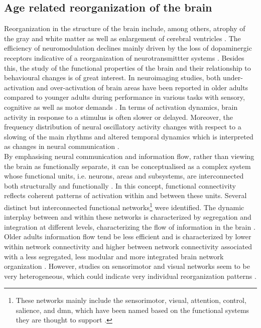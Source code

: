 \subsection{Age related reorganization of the brain}
\label{theory:aging:brain}
Reorganization in the structure of the brain include, among others, atrophy of the gray and white matter as well as enlargement of cerebral ventricles \cite{Fjell2010}. The efficiency of neuromodulation declines mainly driven by the loss of dopaminergic receptors indicative of a reorganization of neurotransmittter systems \cite{Li2001}. Besides this, the study of the functional properties of the brain and their relationship to behavioural changes is of great interest. In neuroimaging studies, both under-activation and over-activation of brain areas have been reported in older adults compared to younger adults during performance in various tasks with sensory, cognitive as well as motor demands \cite{Reuter-Lorenz2010, Sala-Llonch2015}. In terms of activation dynamics, brain activity in response to a stimulus is often slower or delayed. Moreover, the frequency distribution of neural oscillatory activity changes with respect to a slowing of the main rhythms and altered temporal dynamics which is interpreted as changes in neural communication \cite{Courtney2021}.\\ 
By emphasising neural communication and information flow, rather than viewing the brain as functionally separate, it can be conceptualised as a complex system whose functional units, i.e. neurons, areas and subsystems, are interconnected both structurally and functionally \cite{Friston2011,Deery2023}. In this concept, functional connectivity reflects coherent patterns of activation within and between these units. Several distinct but interconnected functional networks\footnote{These networks mainly include the sensorimotor, visual, attention, control, salience, and \gls{dmn}, which have been named based on the functional systems they are thought to support \cite{Uddin2019}.} were identified. The dynamic interplay between and within these networks is characterized by segregation and integration at different levels, characterizing the flow of information in the brain \cite{Sporns2013}. Older adults information flow tend be less efficient and is characterized by lower within network connectivity and higher between network connectivity associated with a less segregated, less modular and more integrated brain network organization \cite{Sala-Llonch2015,Deery2023, Betzel2014}. However, studies on sensorimotor and visual networks seem to be very heterogeneous, which could indicate very individual reorganization patterns \cite{Deery2023}.

